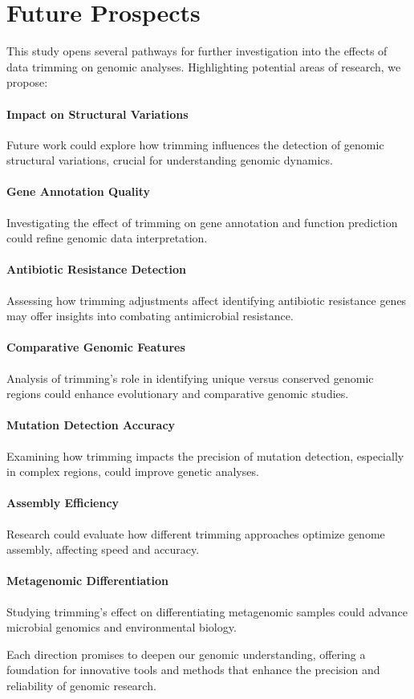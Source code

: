 \section{Future Prospects}

This study opens several pathways for further investigation into the effects of data trimming on genomic analyses. Highlighting potential areas of research, we propose:

\paragraph{Impact on Structural Variations} Future work could explore how trimming influences the detection of genomic structural variations, crucial for understanding genomic dynamics.

\paragraph{Gene Annotation Quality} Investigating the effect of trimming on gene annotation and function prediction could refine genomic data interpretation.

\paragraph{Antibiotic Resistance Detection} Assessing how trimming adjustments affect identifying antibiotic resistance genes may offer insights into combating antimicrobial resistance.

\paragraph{Comparative Genomic Features} Analysis of trimming's role in identifying unique versus conserved genomic regions could enhance evolutionary and comparative genomic studies.

\paragraph{Mutation Detection Accuracy} Examining how trimming impacts the precision of mutation detection, especially in complex regions, could improve genetic analyses.

\paragraph{Assembly Efficiency} Research could evaluate how different trimming approaches optimize genome assembly, affecting speed and accuracy.

\paragraph{Metagenomic Differentiation} Studying trimming's effect on differentiating metagenomic samples could advance microbial genomics and environmental biology.

Each direction promises to deepen our genomic understanding, offering a foundation for innovative tools and methods that enhance the precision and reliability of genomic research.
